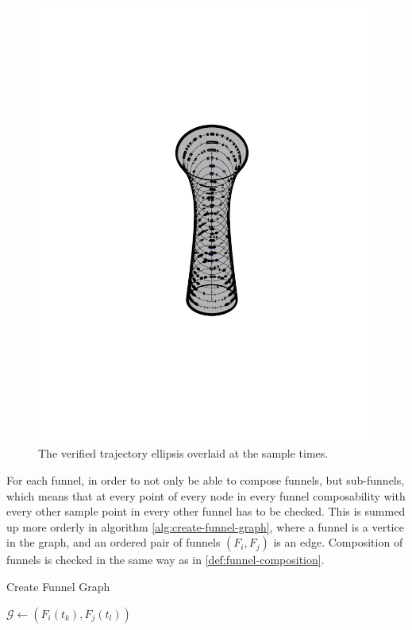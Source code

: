 \begin{figure}
\begin{minipage}[b]{0.4\textwidth}
    \includegraphics[width=\textwidth]{figures/method/funnel-sampled}
    \caption{The verified trajectory ellipsis overlaid at the sample times.}
  \end{minipage}
\end{figure}

For each funnel, in order to not only be able to compose funnels, but
sub-funnels, which means that at every point of every node in every funnel
composability with every other sample point in every other funnel has to be
checked. This is summed up more orderly in algorithm
\ref{alg:create-funnel-graph}, where a funnel is a vertice in the graph, and an
ordered pair of funnels \(\left( F_{i}, F_{j} \right)\) is an edge. Composition
of funnels is checked in the same way as in \ref{def:funnel-composition}.

\begin{algorithm}
  \caption{Create Funnel Graph}
  \label{alg:create-funnel-graph}
  \DontPrintSemicolon \SetAlgoNoLine

   

   {  {
       {  {
           { \(\mathcal{G}
            \leftarrow{} \left( F_{i}(t_{k}), F_{j}(t_{l}) \right)\) } \; } \; }
      \; }\; }\;

\end{algorithm}

